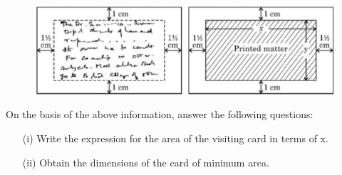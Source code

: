 \documentclass{article}
\begin{document}
\begin{enumerate}
\newpage
\begin{figure}[h!]
\centering
\includegraphics[width=\columnwidth]{images/fig2.jpg}
\label{fig:image2}
\end{figure}

On the basis of the above information, answer the following questions:
\begin{enumerate}
	\item[(i)] Write the expression for the area of the visiting card in terms of x.

	\item[(ii)] Obtain the dimensions of the card of minimum area.



\end{enumerate}
\end{enumerate}
\end{document}
